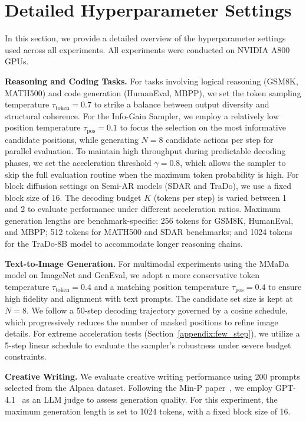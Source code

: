 \section{Detailed Hyperparameter Settings}
\label{appendix:hyperparameters}

In this section, we provide a detailed overview of the hyperparameter settings used across all experiments. All experiments were conducted on NVIDIA A800 GPUs.

\noindent\textbf{Reasoning and Coding Tasks.} For tasks involving logical reasoning (GSM8K, MATH500) and code generation (HumanEval, MBPP), we set the token sampling temperature $\tau_{\text{token}} = 0.7$ to strike a balance between output diversity and structural coherence. For the Info-Gain Sampler, we employ a relatively low position temperature $\tau_{\text{pos}} = 0.1$ to focus the selection on the most informative candidate positions, while generating $N=8$ candidate actions per step for parallel evaluation. To maintain high throughput during predictable decoding phases, we set the acceleration threshold $\gamma = 0.8$, which allows the sampler to skip the full evaluation routine when the maximum token probability is high. For block diffusion settings on Semi-AR models (SDAR and TraDo), we use a fixed block size of 16. The decoding budget $K$ (tokens per step) is varied between 1 and 2 to evaluate performance under different acceleration ratios. Maximum generation lengths are benchmark-specific: 256 tokens for GSM8K, HumanEval, and MBPP; 512 tokens for MATH500 and SDAR benchmarks; and 1024 tokens for the TraDo-8B model to accommodate longer reasoning chains.

\noindent\textbf{Text-to-Image Generation.} For multimodal experiments using the MMaDa model on ImageNet and GenEval, we adopt a more conservative token temperature $\tau_{\text{token}} = 0.4$ and a matching position temperature $\tau_{\text{pos}} = 0.4$ to ensure high fidelity and alignment with text prompts. The candidate set size is kept at $N=8$. We follow a 50-step decoding trajectory governed by a cosine schedule, which progressively reduces the number of masked positions to refine image details. For extreme acceleration tests (Section~\ref{appendix:few_step}), we utilize a 5-step linear schedule to evaluate the sampler's robustness under severe budget constraints.

\noindent\textbf{Creative Writing.} We evaluate creative writing performance using 200 prompts selected from the Alpaca dataset. Following the Min-P paper~\cite{nguyen2024turning}, we employ GPT-4.1~\cite{openai_gpt4_1} as an LLM judge to assess generation quality. For this experiment, the maximum generation length is set to 1024 tokens, with a fixed block size of 16.

